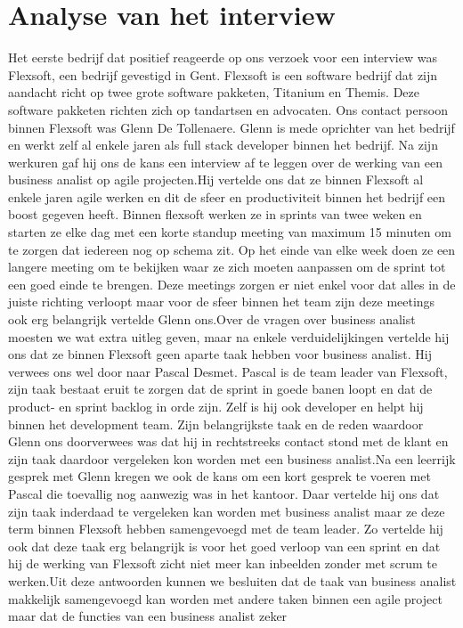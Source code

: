 \documentclass{hogent-article}
\begin{document}
\section{Analyse van het interview}
Het eerste bedrijf dat positief reageerde op ons verzoek voor een interview was Flexsoft, een bedrijf gevestigd in Gent. Flexsoft is een software bedrijf dat zijn aandacht richt op twee grote software pakketen, Titanium en Themis. Deze software pakketen richten zich op tandartsen en advocaten. \newline \newline Ons contact persoon binnen Flexsoft was Glenn De Tollenaere. Glenn is mede oprichter van het bedrijf en werkt zelf al enkele jaren als full stack developer binnen het bedrijf. Na zijn werkuren gaf hij ons de kans een interview af te leggen over de werking van een business analist op agile projecten.\newline \newline Hij vertelde ons dat ze binnen Flexsoft al enkele jaren agile werken en dit de sfeer en productiviteit binnen het bedrijf een boost gegeven heeft. Binnen flexsoft werken ze in sprints van twee weken en starten ze elke dag met een korte standup meeting van maximum 15 minuten om te zorgen dat iedereen nog op schema zit. Op het einde van elke week doen ze een langere meeting om te bekijken waar ze zich moeten aanpassen om de sprint tot een goed einde te brengen. Deze meetings zorgen er niet enkel voor dat alles in de juiste richting verloopt maar voor de sfeer binnen het team zijn deze meetings ook erg belangrijk vertelde Glenn ons.\newline \newline Over de vragen over business analist moesten we wat extra uitleg geven, maar na enkele verduidelijkingen vertelde hij ons dat ze binnen Flexsoft geen aparte taak hebben voor business analist. Hij verwees ons wel door naar Pascal Desmet. Pascal is de team leader van Flexsoft, zijn taak bestaat eruit te zorgen dat de sprint in goede banen loopt en dat de product- en sprint backlog in orde zijn. Zelf is hij ook developer en helpt hij binnen het development team. Zijn belangrijkste taak en de reden waardoor Glenn ons doorverwees was dat hij in rechtstreeks contact stond met de klant en zijn taak daardoor vergeleken kon worden met een business analist.\newline \newline Na een leerrijk gesprek met Glenn kregen we ook de kans om een kort gesprek te voeren met Pascal die toevallig nog aanwezig was in het kantoor. Daar vertelde hij ons dat zijn taak inderdaad te vergeleken kan worden met business analist maar ze deze term binnen Flexsoft hebben samengevoegd met de team leader. Zo vertelde hij ook dat deze taak erg belangrijk is voor het goed verloop van een sprint en dat hij de werking van Flexsoft zicht niet meer kan inbeelden zonder met scrum te werken.\newline \newline Uit deze antwoorden kunnen we besluiten dat de taak van business analist makkelijk samengevoegd kan worden met andere taken binnen een agile project maar dat de functies van een business analist zeker 
\end{document}
